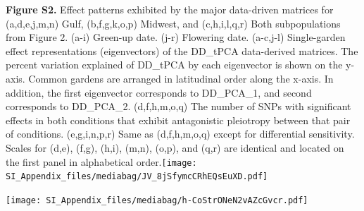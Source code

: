 \documentclass[
  letterpaper,
  DIV=11,
  numbers=noendperiod]{scrartcl}
\begin{document}
\textbf{Figure S2.} Effect patterns exhibited by the major data-driven
matrices for (a,d,e,j,m,n) Gulf, (b,f,g,k,o,p) Midwest, and
(c,h,i,l,q,r) Both subpopulations from Figure 2. (a-i) Green-up date.
(j-r) Flowering date. (a-c,j-l) Single-garden effect representations
(eigenvectors) of the DD\_tPCA data-derived matrices. The percent
variation explained of DD\_tPCA by each eigenvector is shown on the
y-axis. Common gardens are arranged in latitudinal order along the
x-axis. In addition, the first eigenvector corresponds to DD\_PCA\_1,
and second corresponds to DD\_PCA\_2. (d,f,h,m,o,q) The number of SNPs
with significant effects in both conditions that exhibit antagonistic
pleiotropy between that pair of conditions. (e,g,i,n,p,r) Same as
(d,f,h,m,o,q) except for differential sensitivity. Scales for (d,e),
(f,g), (h,i), (m,n), (o,p), and (q,r) are identical and located on the
first panel in alphabetical
order.\texttt{[image: SI\_Appendix\_files/mediabag/JV\_8jSfymcCRhEQsEuXD.pdf]}

\hfill\break

\hfill\break
\texttt{[image: SI\_Appendix\_files/mediabag/h-CoStrONeN2vAZcGvcr.pdf]}
\end{document}
